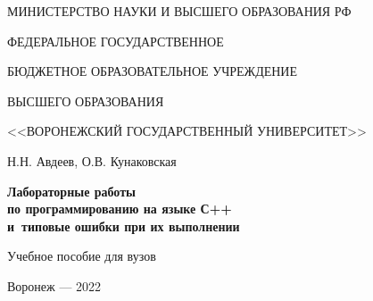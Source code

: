 

\thispagestyle{empty}
{
\large



\begin{center}

МИНИСТЕРСТВО НАУКИ И ВЫСШЕГО ОБРАЗОВАНИЯ РФ

\vspace{3mm}

ФЕДЕРАЛЬНОЕ ГОСУДАРСТВЕННОЕ
\vspace{3mm}

БЮДЖЕТНОЕ ОБРАЗОВАТЕЛЬНОЕ УЧРЕЖДЕНИЕ
\vspace{3mm}

ВЫСШЕГО ОБРАЗОВАНИЯ
\vspace{3mm}



<<ВОРОНЕЖСКИЙ ГОСУДАРСТВЕННЫЙ УНИВЕРСИТЕТ>>
\vspace{30mm}

 { \Large Н.Н. Авдеев, О.В. Кунаковская}
\vspace{30mm}

{\Huge \bf
	Лабораторные работы
	\\\vspace{5mm}
	по программированию на языке С++
	\\\vspace{5mm}
	и~типовые ошибки при их выполнении


}

\vspace{30mm}

            {\Large   Учебное пособие для вузов }

\end{center}

\vspace{55mm}





\begin{center}









{\Large Воронеж --- 2022}

\end{center}
}
\newpage
